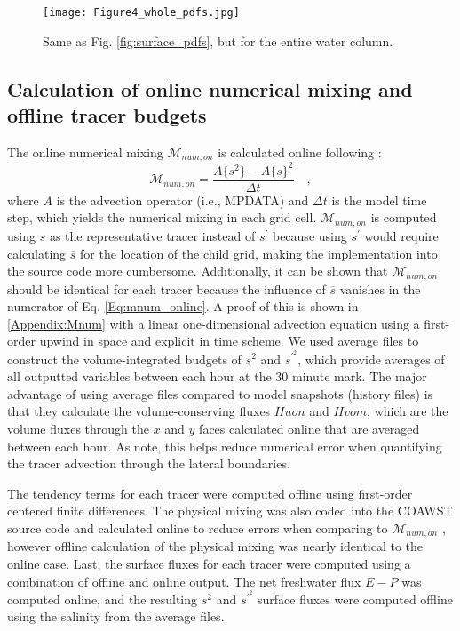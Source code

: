 \documentclass[draft]{agujournal2019}
\begin{document}
\begin{figure}[ht] 
 \centerline{\texttt{[image: Figure4\_whole\_pdfs.jpg]}}
  \caption{Same as Fig. \ref{fig:surface_pdfs}, but for the entire water column.}
  \label{fig:whole_pdfs}
\end{figure}

\subsection{Calculation of online numerical mixing and offline tracer budgets}

The online numerical mixing $\mathcal{M}_{num, on}$ is calculated online following :
\begin{equation}\label{Eq:mnum_online}
    \mathcal{M}_{num, on} = \frac{A\{ s^2 \}-A \{s \}^2}{\Delta t} \quad ,
\end{equation}
where $A$ is the advection operator (i.e., MPDATA) and $\Delta t$ is the model time step, which yields the numerical mixing in each grid cell. $\mathcal{M}_{num, on}$ is computed using $s$ as the representative tracer instead of $s^{\prime}$ because using $s^{\prime}$ would require calculating $\overline{s}$ for the location of the child grid, making the implementation into the source code more cumbersome. Additionally, it can be shown that $\mathcal{M}_{num, on}$ should be identical for each tracer because the influence of $\overline{s}$ vanishes in the numerator of Eq. \ref{Eq:mnum_online}. A proof of this is shown in \ref{Appendix:Mnum} with a linear one-dimensional advection equation using a first-order upwind in space and explicit in time scheme. 
We used average files to construct the volume-integrated budgets of $s^2$ and $s^{\prime^2}$, which provide averages of all outputted variables between each hour at the 30 minute mark. The major advantage of using average files compared to model snapshots (history files) is that they calculate the volume-conserving fluxes $Huon$ and $Hvom$, which are the volume fluxes through the $x$ and $y$ faces calculated online that are averaged between each hour. As  note, this helps reduce numerical error when quantifying the tracer advection through the lateral boundaries. 

The tendency terms for each tracer were computed offline using first-order centered finite differences. The physical mixing was also coded into the COAWST source code and calculated online to reduce errors when comparing to $\mathcal{M}_{num, on}$ \cite{Kalra_2019}, however offline calculation of the physical mixing was nearly identical to the online case. Last, the surface fluxes for each tracer were computed using a combination of offline and online output. The net freshwater flux $E-P$ was computed online, and the resulting $s^2$ and $s^{\prime^2}$ surface fluxes were computed offline using the salinity from the average files.
\end{document}

